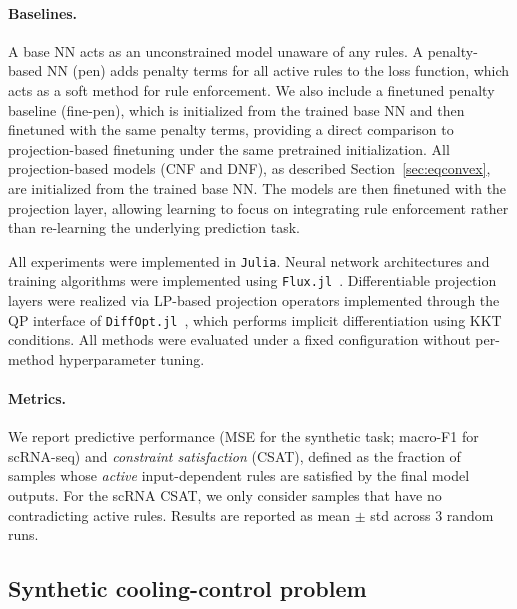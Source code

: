 \documentclass{article}
\newcommand {\cl}[1]{{\color{blue}{(Can: #1}}}
\theoremstyle{plain}
\theoremstyle{definition}
\theoremstyle{remark}
\begin{document}
\paragraph{Baselines.} A base NN acts as an unconstrained model unaware of any rules. A penalty-based NN (pen) adds penalty terms for all active rules to the loss function, which acts as a soft method for rule enforcement. We also include a finetuned penalty baseline (fine-pen), which is initialized from the trained base NN and then finetuned with the same penalty terms, providing a direct comparison to projection-based finetuning under the same pretrained initialization. All projection-based models (CNF and DNF), as described Section~\ref{sec:eqconvex}, are initialized from the trained base NN. The models are then finetuned with the projection layer, allowing learning to focus on integrating rule enforcement rather than re-learning the underlying prediction task. 

All experiments were implemented in \texttt{Julia}. Neural network architectures and training algorithms were implemented using \texttt{Flux.jl}~\cite{Flux.jl-2018}. Differentiable projection layers were realized via LP-based projection operators implemented through the QP interface of \texttt{DiffOpt.jl}~\cite{besancon2023diffopt}, which performs implicit differentiation using KKT conditions. All methods were evaluated under a fixed configuration without per-method hyperparameter tuning.


\paragraph{Metrics.}
We report predictive performance (MSE for the synthetic task; macro-F1 for scRNA-seq) and \emph{constraint satisfaction} (CSAT), defined as the fraction of samples whose \emph{active} input-dependent rules are satisfied by the final model outputs. For the scRNA CSAT, we only consider samples that have no contradicting active rules. Results are reported as mean $\pm$ std across 3 random runs.

\subsection{Synthetic cooling-control problem}
\end{document}
